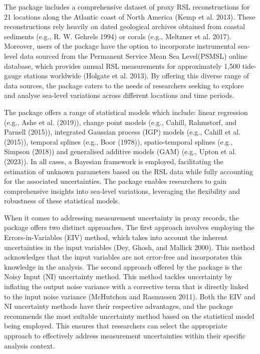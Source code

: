The  package includes a comprehensive dataset of proxy RSL reconstructions for 21 locations along the Atlantic coast of North America (Kemp et al. 2013). These reconstructions rely heavily on dated geological archives obtained from coastal sediments (e.g., R. W. Gehrels 1994) or corals (e.g., Meltzner et al. 2017). Moreover, users of the package have the option to incorporate instrumental sea-level data sourced from the Permanent Service Mean Sea Level(PSMSL) online database, which provides annual RSL measurements for approximately 1,500 tide-gauge stations worldwide (Holgate et al. 2013). By offering this diverse range of data sources, the  package caters to the needs of researchers seeking to explore and analyse sea-level variations across different locations and time periods.

The  package offers a range of statistical models which include: linear regression (e.g., Ashe et al. (2019)), change point models (e.g., Cahill, Rahmstorf, and Parnell (2015)), integrated Gaussian process (IGP) models (e.g., Cahill et al. (2015)), temporal splines (e.g., Boor (1978)), spatio-temporal splines (e.g., Simpson (2018)) and generalised additive models (GAM) (e.g., Upton et al. (2023)). In all cases, a Bayesian framework is employed, facilitating the estimation of unknown parameters based on the RSL data while fully accounting for the associated uncertainties. The  package enables researchers to gain comprehensive insights into sea-level variations, leveraging the flexibility and robustness of these statistical models.

When it comes to addressing measurement uncertainty in proxy records, the  package offers two distinct approaches. The first approach involves employing the Errors-in-Variables (EIV) method, which takes into account the inherent uncertainties in the input variables (Dey, Ghosh, and Mallick 2000). This method acknowledges that the input variables are not error-free and incorporates this knowledge in the analysis. The second approach offered by the package is the Noisy Input (NI) uncertainty method. This method tackles uncertainty by inflating the output noise variance with a corrective term that is directly linked to the input noise variance (McHutchon and Rasmussen 2011). Both the EIV and NI uncertainty methods have their respective advantages, and the  package recommends the most suitable uncertainty method based on the statistical model being employed. This ensures that researchers can select the appropriate approach to effectively address measurement uncertainties within their specific analysis context.

